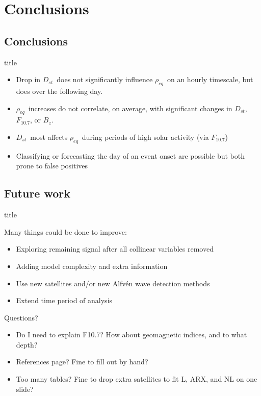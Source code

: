 \documentclass[xcolor={dvipsnames,table}]{beamer}
\newcommand{\subheader}{    		\begin{center}
  	\begin{beamercolorbox}[sep=4pt,center,shadow=true,rounded=true]{title}
  		\usebeamerfont{title}\subsecname\par%
  	\end{beamercolorbox}
  	\vfill
  	\end{center}}
\newcommand{\req}{\ensuremath{\rho_{eq}}} %
\newcommand{\dst}{\ensuremath{D_{st}}} %
\newcommand{\f}{\ensuremath{F_{10.7}}} %
\begin{document}
\section{Conclusions}
\subsection{Conclusions}
\begin{frame}
	\subheader
	\begin{itemize}
		\item Drop in \dst\ does not significantly influence \req\ on an hourly timescale, but does over the following day.
		\item \req\ increases do not correlate, on average, with significant changes in \dst, \f, or $B_z$.
		\item \dst\ most affects \req\ during periods of high solar activity (via \f)
		\item Classifying or forecasting the day of an event onset are possible but both prone to false positives
	\end{itemize}
\end{frame}


\subsection{Future work}
\begin{frame}
	\subheader
	Many things could be done to improve:
	\begin{itemize}
		\item Exploring remaining signal after all collinear variables removed
		\item Adding model complexity and extra information
		\item Use new satellites and/or new Alfvén wave detection methods
		\item Extend time period of analysis
	\end{itemize}
\end{frame}


\begin{frame}[c]
	\begin{center}
		\huge
		Questions?
	\end{center}
	\small
	\begin{itemize}
		\item Do I need to explain F10.7? How about geomagnetic indices, and to what depth?
		\item References page? Fine to fill out by hand?
		\item Too many tables? Fine to drop extra satellites to fit L, ARX, and NL on one slide?
	\end{itemize}
\end{frame}





\begin{frame}
	\tiny
	
	
\end{frame}
\end{document}
